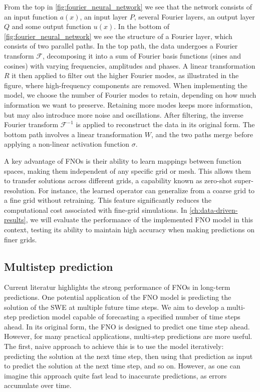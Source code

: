From the top in \autoref{fig:fourier_neural_network} we see that the network consists of an input function $a(x)$, an input layer $P$, several Fourier layers, an output layer $Q$ and some output function $u(x)$.
In the bottom of \autoref{fig:fourier_neural_network} we see the structure of a Fourier layer, which consists of two parallel paths.
In the top path, the data undergoes a Fourier transform $\mathcal{F}$, decomposing it into a sum of Fourier basis functions (sines and cosines) with varying frequencies, amplitudes and phases.
A linear transformation $R$ it then applied to filter out the higher Fourier modes, as illustrated in the figure, where high-frequency components are removed.
When implementing the model, we choose the number of Fourier modes to retain, depending on how much information we want to preserve.
Retaining more modes keeps more information, but may also introduce more noise and oscillations.
After filtering, the inverse Fourier transform $\mathcal{F}^{-1}$ is applied to reconstruct the data in its original form.
The bottom path involves a linear transformation $W$, and the two paths merge before applying a non-linear activation function $\sigma$.

A key advantage of FNOs is their ability to learn mappings between function spaces, making them independent of any specific grid or mesh.
This allows them to transfer solutions across different grids, a capability known as zero-shot super-resolution.
For instance, the learned operator can generalize from a coarse grid to a fine grid without retraining.
This feature significantly reduces the computational cost associated with fine-grid simulations.
In \autoref{ch:data-driven-results}, we will evaluate the performance of the implemented FNO model in this context, testing its ability to maintain high accuracy when making predictions on finer grids.

\subsection*{Multistep prediction}
Current literatur highlights the strong performance of FNOs in long-term predictions.
One potential application of the FNO model is predicting the solution of the SWE at multiple future time steps.
We aim to develop a multi-step prediction model capable of forecasting a specified number of time steps ahead.
In its original form, the FNO is designed to predict one time step ahead.
However, for many practical applications, multi-step predictions are more useful.
The first, naive approach to achieve this is to use the model iteratively: predicting the solution at the next time step, then using that prediction as input to predict the solution at the next time step, and so on.
However, as one can imagine this approach quite fast lead to inaccurate predictions, as errors accumulate over time.


